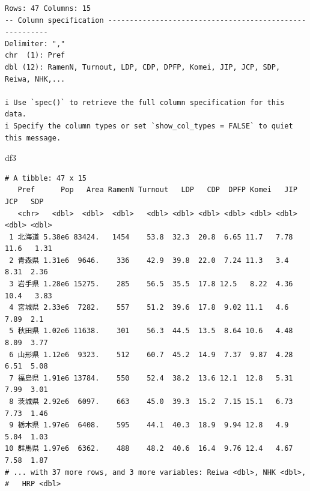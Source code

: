 \documentclass[
  a4paper,
  pandoc,
  ja=standard,
  jafont=haranoaji]{bxjsbook}
\newenvironment{Shaded}{\begin{snugshade}}{\end{snugshade}}
\newcommand{\NormalTok}[1]{\textcolor[rgb]{0.00,0.48,0.65}{#1}}
\begin{document}
\begin{verbatim}
Rows: 47 Columns: 15
-- Column specification --------------------------------------------------------
Delimiter: ","
chr  (1): Pref
dbl (12): RamenN, Turnout, LDP, CDP, DPFP, Komei, JIP, JCP, SDP, Reiwa, NHK,...

i Use `spec()` to retrieve the full column specification for this data.
i Specify the column types or set `show_col_types = FALSE` to quiet this message.
\end{verbatim}

\begin{Shaded}
\begin{Highlighting}[numbers=left,,]
\NormalTok{df3}
\end{Highlighting}
\end{Shaded}

\begin{verbatim}
# A tibble: 47 x 15
   Pref      Pop   Area RamenN Turnout   LDP   CDP  DPFP Komei   JIP   JCP   SDP
   <chr>   <dbl>  <dbl>  <dbl>   <dbl> <dbl> <dbl> <dbl> <dbl> <dbl> <dbl> <dbl>
 1 北海道 5.38e6 83424.   1454    53.8  32.3  20.8  6.65 11.7   7.78 11.6   1.31
 2 青森県 1.31e6  9646.    336    42.9  39.8  22.0  7.24 11.3   3.4   8.31  2.36
 3 岩手県 1.28e6 15275.    285    56.5  35.5  17.8 12.5   8.22  4.36 10.4   3.83
 4 宮城県 2.33e6  7282.    557    51.2  39.6  17.8  9.02 11.1   4.6   7.89  2.1 
 5 秋田県 1.02e6 11638.    301    56.3  44.5  13.5  8.64 10.6   4.48  8.09  3.77
 6 山形県 1.12e6  9323.    512    60.7  45.2  14.9  7.37  9.87  4.28  6.51  5.08
 7 福島県 1.91e6 13784.    550    52.4  38.2  13.6 12.1  12.8   5.31  7.99  3.01
 8 茨城県 2.92e6  6097.    663    45.0  39.3  15.2  7.15 15.1   6.73  7.73  1.46
 9 栃木県 1.97e6  6408.    595    44.1  40.3  18.9  9.94 12.8   4.9   5.04  1.03
10 群馬県 1.97e6  6362.    488    48.2  40.6  16.4  9.76 12.4   4.67  7.58  1.87
# ... with 37 more rows, and 3 more variables: Reiwa <dbl>, NHK <dbl>,
#   HRP <dbl>
\end{verbatim}
\end{document}
